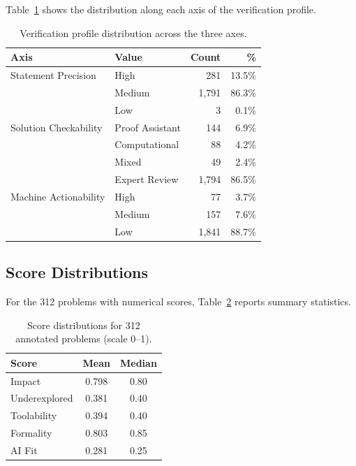 \documentclass[11pt]{article}
\begin{document}
Table~\ref{tab:verif-profile} shows the distribution along each axis of the verification profile.

\begin{table}[H]
\centering
\caption{Verification profile distribution across the three axes.}
\label{tab:verif-profile}
\begin{tabular}{@{}llrr@{}}
\toprule
\textbf{Axis} & \textbf{Value} & \textbf{Count} & \textbf{\%} \\
\midrule
Statement Precision & High   & 281   & 13.5\% \\
                    & Medium & 1{,}791 & 86.3\% \\
                    & Low    & 3     & 0.1\% \\
\midrule
Solution Checkability & Proof Assistant  & 144   & 6.9\% \\
                      & Computational    & 88    & 4.2\% \\
                      & Mixed            & 49    & 2.4\% \\
                      & Expert Review    & 1{,}794 & 86.5\% \\
\midrule
Machine Actionability & High   & 77    & 3.7\% \\
                      & Medium & 157   & 7.6\% \\
                      & Low    & 1{,}841 & 88.7\% \\
\bottomrule
\end{tabular}
\end{table}

\subsection{Score Distributions}

For the 312 problems with numerical scores, Table~\ref{tab:scores} reports summary statistics.

\begin{table}[H]
\centering
\caption{Score distributions for 312 annotated problems (scale 0--1).}
\label{tab:scores}
\begin{tabular}{@{}lcc@{}}
\toprule
\textbf{Score} & \textbf{Mean} & \textbf{Median} \\
\midrule
Impact        & 0.798 & 0.80 \\
Underexplored & 0.381 & 0.40 \\
Toolability   & 0.394 & 0.40 \\
Formality     & 0.803 & 0.85 \\
AI Fit        & 0.281 & 0.25 \\
\bottomrule
\end{tabular}
\end{table}
\end{document}
